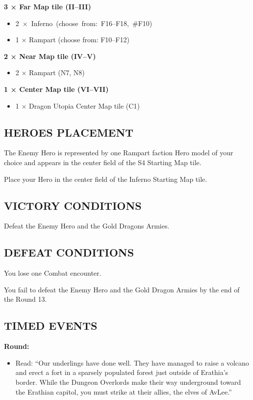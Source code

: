 \begin{multicols*}{2}
\vspace*{\fill}
\columnbreak

\textbf{3 × Far Map tile (II--III)}
\begin{itemize}
  \item \mbox{2 × Inferno (choose from: F16--F18, \#F10)}
  \item 1 × Rampart (choose from: F10--F12)
\end{itemize}

\textbf{2 × Near Map tile (IV--V)}
\begin{itemize}
  \item 2 × Rampart (N7, N8)
\end{itemize}

\textbf{1 × Center Map tile (VI--VII)}
\begin{itemize}
  \item 1 × Dragon Utopia Center Map tile (C1)
\end{itemize}

\subsection*{\MakeUppercase{Heroes placement}}

The Enemy Hero is represented by one Rampart faction Hero model of your choice
and appears in the center field of the S4 Starting Map tile.

Place your Hero in the center field of the Inferno Starting Map tile.

\subsection*{\MakeUppercase{Victory Conditions}}

Defeat the Enemy Hero and the Gold Dragons Armies.

\subsection*{\MakeUppercase{Defeat Conditions}}

You lose one Combat encounter.

You fail to defeat the Enemy Hero and the Gold Dragon Armies by the end of the Round 13.

\subsection*{\MakeUppercase{Timed Events}}

\textbf{ Round:}
\begin{itemize}
  \item Read: ``Our underlings have done well. They have managed to raise a volcano
    and erect a fort in a sparsely populated forest just outside of Erathia's border.
    While the Dungeon Overlords make their way underground toward the Erathian capitol,
    you must strike at their allies, the elves of AvLee.''
\end{itemize}


\end{multicols*}
